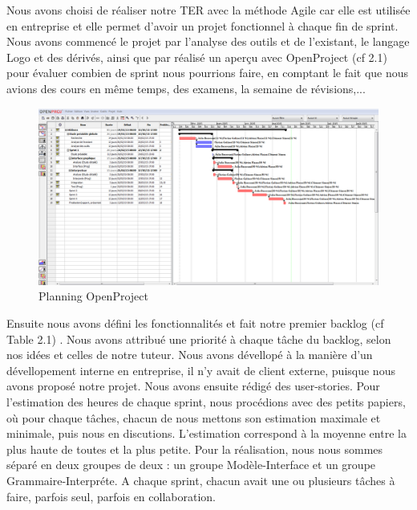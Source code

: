 Nous avons choisi de réaliser notre TER avec la méthode Agile car elle est utilisée en entreprise et elle permet d'avoir un projet fonctionnel à chaque fin de sprint.
Nous avons commencé le projet par l'analyse des outils et de l'existant, le langage Logo et des dérivés, ainsi que par réalisé un aperçu avec OpenProject (cf 2.1) pour évaluer combien de sprint nous pourrions faire, en comptant le fait que nous avions des cours en même temps, des examens, la semaine de révisions,...
\begin{figure}[h]
\caption{\label{planning} Planning OpenProject}
\includegraphics[scale=0.35]{doc/gestionProjet/planning.PNG}
\end{figure}
Ensuite nous avons défini les fonctionnalités et fait notre premier backlog (cf Table 2.1) .
Nous avons attribué une priorité à chaque tâche du backlog, selon nos idées et celles de notre tuteur. Nous avons dévellopé à la manière d'un dévellopement interne en entreprise, il n'y avait de client externe, puisque nous avons proposé notre projet.
Nous avons ensuite rédigé des user-stories.
Pour l'estimation des heures de chaque sprint, nous procédions avec des petits papiers, où pour chaque tâches, chacun de nous mettons son estimation maximale et minimale, puis nous en discutions. L'estimation correspond à la moyenne entre la plus haute de toutes et la plus petite.
Pour la réalisation, nous nous sommes séparé en deux groupes de deux : un groupe Modèle-Interface et un groupe Grammaire-Interpréte.
A chaque sprint, chacun avait une ou plusieurs tâches à faire, parfois seul, parfois en collaboration.

